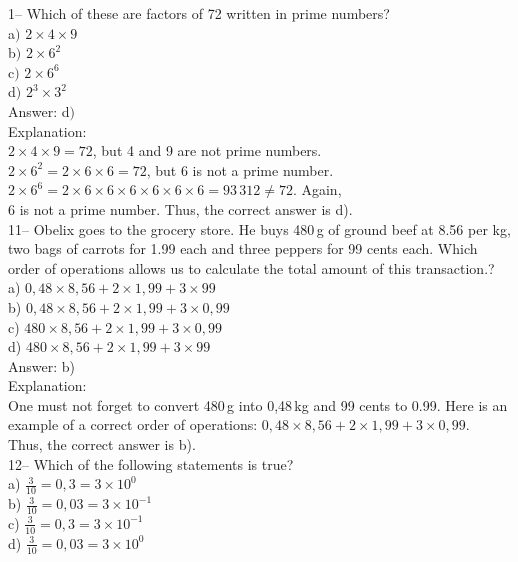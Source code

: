 \documentclass[letterpaper, 12pt]{article}
\begin{document}
1-- Which of these are factors of 72 written in prime numbers?\\
a$)$ $2 \times 4 \times 9$\\
b$)$ $2 \times 6^{2}$\\
c$)$ $2 \times 6^{6}$\\
d$)$ $2^{3} \times 3^{2}$\\

Answer: d$)$\\

Explanation:\\
$2 \times 4 \times 9 = 72$, but 4 and 9 are not prime numbers.\\
$2 \times 6^{2} = 2 \times 6 \times 6 = 72$, but 6 is not a prime number.\\
$2 \times 6^{6} = 2 \times 6 \times 6 \times 6 \times 6 \times 6
\times 6 = 93\,312 \neq72$.  Again,\\ 6 is not a prime number. Thus, the correct answer is d).\\



11-- Obelix goes to the grocery store. He buys 480\,g of ground beef at 8.56 per kg, two bags of carrots for 1.99 each and three peppers for 99 cents each. Which order of operations allows us to calculate the total amount of this transaction.?\\
a) $0,48 \times 8,56 + 2 \times 1,99 + 3 \times 99$\\
b) $0,48 \times 8,56 + 2 \times 1,99 + 3 \times 0,99$\\
c) $480 \times 8,56 + 2 \times 1,99 + 3 \times 0,99$\\
d) $480 \times 8,56 + 2 \times 1,99 + 3 \times 99$\\

Answer: b)\\

Explanation:\\
One must not forget to convert 480\,g into 0,48\,kg and 99 cents to 0.99. Here is an example of a correct order of operations:  $0,48 \times 8,56 + 2 \times 1,99 + 3 \times
0,99$.\\
Thus, the correct answer is b).\\

12-- Which of the following statements is true?\\
a) $\frac{3}{10}=0,3=3\times10^{0}$ \\ [2mm]
b) $\frac{3}{10}=0,03=3\times10^{-1}$ \\[2mm]
c) $\frac{3}{10}=0,3=3\times10^{-1}$ \\[2mm]
d) $\frac{3}{10}=0,03=3\times10^{0}$ \\
\end{document}
